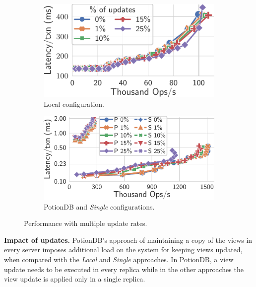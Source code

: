 \documentclass[sigplan,twocolumn,review,anonymous]{acmart}
\begin{document}
\begin{figure}
	\centering
	\begin{subfigure}{.47\linewidth}
		\includegraphics[width=1\linewidth]{singleQuery/upd_rate_local_tc_short}
		\caption{Local configuration.}
		\label{fig:update_rates_local_tc}
	\end{subfigure}%
	\hspace*{0.2em}
	\begin{subfigure}{.52\linewidth}
		\includegraphics[width=1\linewidth]{singleQuery/upd_rate_tc_global_vs_single}
		\caption{PotionDB and \textit{Single} configurations.}
		\label{fig:update_rates_global_single_tc}
	\end{subfigure}%
	\vspace*{-0.65em}
	\caption{Performance with multiple update rates.}
	\label{fig:upds_tc}
	\vspace*{-1.2em}
\end{figure}


\noindent
\textbf{Impact of updates.}
PotionDB's approach of maintaining a copy of the views in every server imposes additional load on the system
for keeping views updated,  when compared with the \textit{Local} and \textit{Single} approaches. 
In PotionDB, a view update needs to be executed in every replica while in the other approaches the view update 
is applied only in a single replica. 
\end{document}
